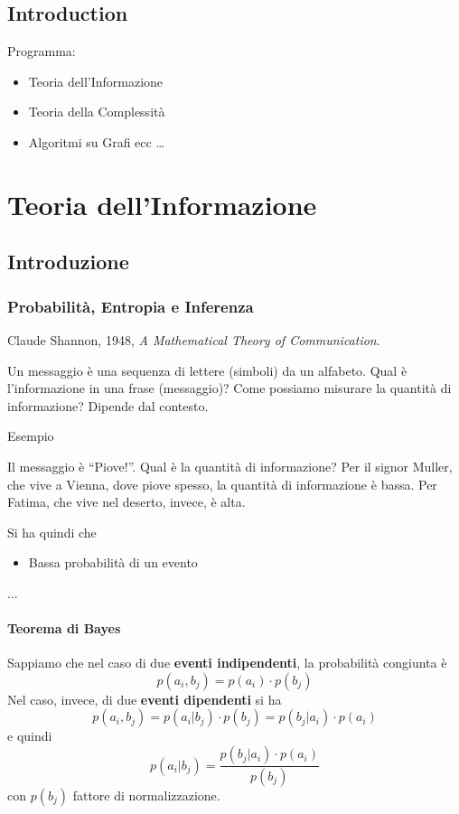 \chapter*{Introduction}

Programma:
\begin{itemize}
    \item Teoria dell'Informazione
    \item Teoria della Complessità
    \item Algoritmi su Grafi ecc \dots
\end{itemize}





\part{Teoria dell'Informazione}

\chapter{Introduzione}

\section{Probabilità, Entropia e Inferenza}
Claude Shannon, 1948, \textit{A Mathematical Theory of Communication}.

Un messaggio è una sequenza di lettere (simboli) da un alfabeto. Qual è l'informazione in una frase (messaggio)? Come possiamo misurare la quantità di informazione? Dipende dal contesto.

\subparagraph{Esempio} Il messaggio è ``Piove!''. Qual è la quantità di informazione? Per il signor Muller, che vive a Vienna, dove piove spesso, la quantità di informazione è bassa. Per Fatima, che vive nel deserto, invece, è alta.\bigskip

Si ha quindi che
\begin{itemize}
    \item Bassa probabilità di un evento 
\end{itemize}

...

\subsection{Teorema di Bayes}
Sappiamo che nel caso di due \textbf{eventi indipendenti}, la probabilità congiunta è
$$
    p(a_i,b_j) = p(a_i)\cdot p(b_j)
$$
Nel caso, invece, di due \textbf{eventi dipendenti} si ha
$$
    p(a_i,b_j) = p(a_i|b_j)\cdot p(b_j) = p(b_j|a_i)\cdot p(a_i)
$$
e quindi
$$
p(a_i|b_j) = \dfrac{p(b_j|a_i)\cdot p(a_i)}{p(b_j)}
$$
con $p(b_j)$ fattore di normalizzazione.

